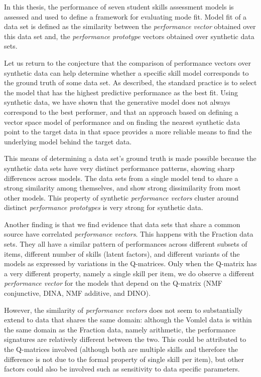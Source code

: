 \label{sec:Conclusion}

In this thesis, the performance of seven student skills assessment models is assessed and used to define a framework for evaluating mode fit.  Model fit of a data set is defined as the similarity between the \textit{performance vector} obtained over this data set and, the \textit{performance prototype} vectors obtained over synthetic data sets.

Let us return to the conjecture that the comparison of performance vectors over synthetic data can help determine whether a specific skill model corresponds to the ground truth of some data set. As described, the standard practice is to select the model that has the highest predictive performance as the best fit.  Using synthetic data, we have shown that the generative model does not always correspond to the best performer, and that an approach based on defining a vector space model of performance and on finding the nearest synthetic data point to the target data in that space provides a more reliable means to find the underlying model behind the target data.

This means of determining a data set's ground truth is made possible because the synthetic data sets have very distinct performance patterns, showing sharp differences across models.  The data sets from a single model tend to share a strong similarity among themselves, and show strong dissimilarity from most other models.  This property of synthetic \textit{performance vectors} cluster around distinct \textit{performance prototypes} is very strong for synthetic data.

Another finding is that we find evidence that data sets that share a common source have correlated \textit{performance vectors}.  This happens with the Fraction data sets.  They all have a similar pattern of performances across different subsets of items, different number of skills (latent factors), and different variants of the models as expressed by variations in the Q-matrices. Only when the Q-matrix has a very different property, namely a single skill per item, we do observe a different \textit{performance vector} for the models that depend on the Q-matrix (NMF conjunctive, DINA, NMF additive, and DINO).  

However, the similarity of \textit{performance vectors} does not seem to substantially extend to data that shares the same domain: although the Vomlel data is within the same domain as the Fraction data, namely arithmetic, the performance signatures are relatively different between the two.  This could be attributed to the Q-matrices involved (although both are multiple skills and therefore the difference is not due to the formal property of single skill per item), but other factors could also be involved such as sensitivity to data specific parameters.

